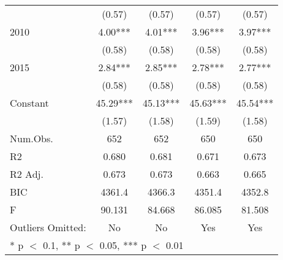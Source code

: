 \begin{table}
\begin{tabular}[t]{lcccc}
 & (0.57) & (0.57) & (0.57) & (0.57)\\
2010 & 4.00*** & 4.01*** & 3.96*** & 3.97***\\
 & (0.58) & (0.58) & (0.58) & \vphantom{1} (0.58)\\
2015 & 2.84*** & 2.85*** & 2.78*** & 2.77***\\
 & (0.58) & (0.58) & (0.58) & (0.58)\\
Constant & 45.29*** & 45.13*** & 45.63*** & 45.54***\\
 & (1.57) & (1.58) & (1.59) & (1.58)\\
\midrule
Num.Obs. & 652 & 652 & 650 & 650\\
R2 & 0.680 & 0.681 & 0.671 & 0.673\\
R2 Adj. & 0.673 & 0.673 & 0.663 & 0.665\\
BIC & 4361.4 & 4366.3 & 4351.4 & 4352.8\\
F & 90.131 & 84.668 & 86.085 & 81.508\\
Outliers Omitted: & No & No & Yes & Yes\\
\bottomrule
\multicolumn{5}{l}{\textsuperscript{} * p $<$ 0.1, ** p $<$ 0.05, *** p $<$ 0.01}\\
\end{tabular}
\end{table}

